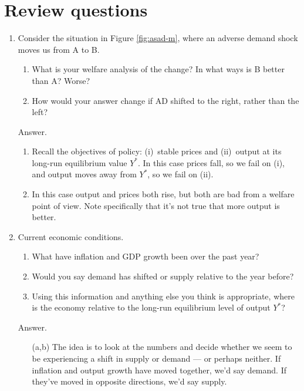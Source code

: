 \section*{Review questions}

\setlength{\leftmargini}{.5\oldleftmargini}
\begin{enumerate}
\item Consider the situation in Figure \ref{fig:asad-m},
where an adverse demand shock moves us from A to B.
\begin{enumerate}
\item What is your welfare analysis of the change?
In what ways is B better than A?  Worse?
\item How would your answer change if AD shifted to the right,
rather than the left?
\end{enumerate}

Answer.
\begin{enumerate}
\item Recall the objectives of policy:  (i)~stable prices
and (ii)~output at its long-run equilibrium value $Y^*$.
In this case prices fall, so we fail on (i), and output moves
away from $Y^*$, so we fail on (ii).
\item In this case output and prices both rise,
but both are bad from a welfare point of view.
Note specifically that it's not true that more output is better.
\end{enumerate}

\item Current economic conditions.
\begin{enumerate}
\item What have inflation and GDP growth been over the past year?
\item Would you say demand has shifted or supply relative to the year before?
\item Using this information and anything else you think is appropriate,
where is the economy relative to the long-run equilibrium level of output $Y^*$?
\end{enumerate}

Answer.
\begin{enumerate}
\item [(a,b)] The idea is to look at the numbers and decide whether
we seem to be experiencing a shift in supply or demand --- or perhaps neither.
If inflation and output growth have moved together, we'd say demand.
If they've moved in opposite directions, we'd say supply.


\end{enumerate}
\end{enumerate}
